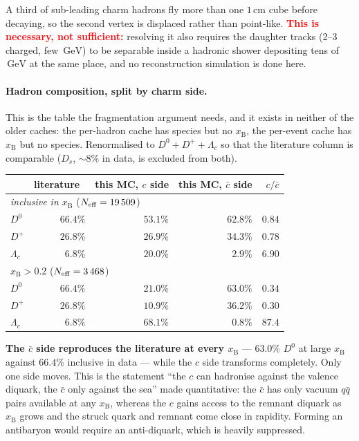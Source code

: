 \documentclass[11pt,a4paper]{article}
\newcommand{\xB}{x_{\mathrm{B}}}
\newcommand{\GeV}{\,\mathrm{GeV}}
\newcommand{\note}[1]{\textcolor{red}{\textbf{#1}}}
\begin{document}
\noindent
A third of sub-leading charm hadrons fly more than one $1$\,cm cube before
decaying, so the second vertex is displaced rather than point-like. \note{This is
necessary, not sufficient:} resolving it also requires the daughter tracks (2--3
charged, few $\GeV$) to be separable inside a hadronic shower depositing tens of
$\GeV$ at the same place, and no reconstruction simulation is done here.

\paragraph{Hadron composition, split by charm side.} This is the table the
fragmentation argument needs, and it exists in neither of the older caches: the
per-hadron cache has species but no $\xB$, the per-event cache has $\xB$ but no
species. Renormalised to $D^0+D^++\Lambda_c$ so that the literature column is
comparable ($D_s$, ${\sim}8\%$ in data, is excluded from both).

\begin{center}\small
\begin{tabular}{lrrrr}
\toprule
 & literature~\cite{lisovyi} & this MC, $c$ side & this MC, $\bar{c}$ side & $c/\bar{c}$ \\
\midrule
\multicolumn{5}{l}{\emph{inclusive in $\xB$} \quad ($N_{\rm eff}=19\,509$)} \\
$D^0$ & $66.4\%$ & $53.1\%$ & $62.8\%$ & $0.84$ \\
$D^+$ & $26.8\%$ & $26.9\%$ & $34.3\%$ & $0.78$ \\
$\Lambda_c$ & $6.8\%$ & $\mathbf{20.0\%}$ & $\mathbf{2.9\%}$ & $\mathbf{6.90}$ \\
\midrule
\multicolumn{5}{l}{$\xB>0.2$ \quad ($N_{\rm eff}=3\,468$)} \\
$D^0$ & $66.4\%$ & $\mathbf{21.0\%}$ & $63.0\%$ & $0.34$ \\
$D^+$ & $26.8\%$ & $\mathbf{10.9\%}$ & $36.2\%$ & $0.30$ \\
$\Lambda_c$ & $6.8\%$ & $\mathbf{68.1\%}$ & $\mathbf{0.8\%}$ & $\mathbf{87.4}$ \\
\bottomrule
\end{tabular}
\end{center}

\noindent
\textbf{The $\bar{c}$ side reproduces the literature at every $\xB$} --- $63.0\%$
$D^0$ at large $\xB$ against $66.4\%$ inclusive in data --- while the $c$ side
transforms completely. Only one side moves. This is the statement ``the $c$ can
hadronise against the valence diquark, the $\bar{c}$ only against the sea'' made
quantitative: the $\bar{c}$ has only vacuum $q\bar{q}$ pairs available at any
$\xB$, whereas the $c$ gains access to the remnant diquark as $\xB$ grows and the
struck quark and remnant come close in rapidity. Forming an antibaryon would
require an anti-diquark, which is heavily suppressed.
\end{document}
